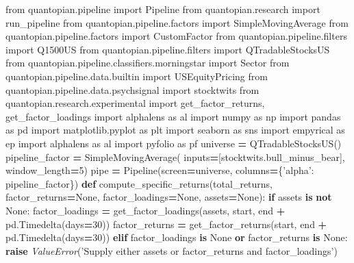 \documentclass[11,]{article}
\newenvironment{Shaded}{\begin{snugshade}}{\end{snugshade}}
\newcommand{\ControlFlowTok}[1]{\textcolor[rgb]{0.13,0.29,0.53}{\textbf{#1}}}
\newcommand{\DecValTok}[1]{\textcolor[rgb]{0.00,0.00,0.81}{#1}}
\newcommand{\ImportTok}[1]{#1}
\newcommand{\KeywordTok}[1]{\textcolor[rgb]{0.13,0.29,0.53}{\textbf{#1}}}
\newcommand{\NormalTok}[1]{#1}
\newcommand{\OperatorTok}[1]{\textcolor[rgb]{0.81,0.36,0.00}{\textbf{#1}}}
\newcommand{\PreprocessorTok}[1]{\textcolor[rgb]{0.56,0.35,0.01}{\textit{#1}}}
\newcommand{\StringTok}[1]{\textcolor[rgb]{0.31,0.60,0.02}{#1}}
\newcommand{\VariableTok}[1]{\textcolor[rgb]{0.00,0.00,0.00}{#1}}
\begin{document}
\begin{Shaded}
\begin{Highlighting}[]
\ImportTok{from}\NormalTok{ quantopian.pipeline }\ImportTok{import}\NormalTok{ Pipeline}
\ImportTok{from}\NormalTok{ quantopian.research }\ImportTok{import}\NormalTok{ run_pipeline}
\ImportTok{from}\NormalTok{ quantopian.pipeline.factors }\ImportTok{import}\NormalTok{ SimpleMovingAverage}
\ImportTok{from}\NormalTok{ quantopian.pipeline.factors }\ImportTok{import}\NormalTok{ CustomFactor}
\ImportTok{from}\NormalTok{ quantopian.pipeline.filters }\ImportTok{import}\NormalTok{ Q1500US}
\ImportTok{from}\NormalTok{ quantopian.pipeline.filters }\ImportTok{import}\NormalTok{ QTradableStocksUS}
\ImportTok{from}\NormalTok{ quantopian.pipeline.classifiers.morningstar }\ImportTok{import}\NormalTok{ Sector}
\ImportTok{from}\NormalTok{ quantopian.pipeline.data.builtin }\ImportTok{import}\NormalTok{ USEquityPricing}
\ImportTok{from}\NormalTok{ quantopian.pipeline.data.psychsignal }\ImportTok{import}\NormalTok{ stocktwits}
\ImportTok{from}\NormalTok{ quantopian.research.experimental }\ImportTok{import}\NormalTok{ get_factor_returns, get_factor_loadings}
\ImportTok{import}\NormalTok{ alphalens }\ImportTok{as}\NormalTok{ al}
\ImportTok{import}\NormalTok{ numpy }\ImportTok{as}\NormalTok{ np}
\ImportTok{import}\NormalTok{ pandas }\ImportTok{as}\NormalTok{ pd}
\ImportTok{import}\NormalTok{ matplotlib.pyplot }\ImportTok{as}\NormalTok{ plt}
\ImportTok{import}\NormalTok{ seaborn }\ImportTok{as}\NormalTok{ sns}
\ImportTok{import}\NormalTok{ empyrical }\ImportTok{as}\NormalTok{ ep}
\ImportTok{import}\NormalTok{ alphalens }\ImportTok{as}\NormalTok{ al}
\ImportTok{import}\NormalTok{ pyfolio }\ImportTok{as}\NormalTok{ pf}
\NormalTok{universe }\OperatorTok{=}\NormalTok{ QTradableStocksUS()}
\NormalTok{pipeline_factor }\OperatorTok{=}\NormalTok{ SimpleMovingAverage(}
\NormalTok{    inputs}\OperatorTok{=}\NormalTok{[stocktwits.bull_minus_bear], }
\NormalTok{    window_length}\OperatorTok{=}\DecValTok{5}\NormalTok{)}
\NormalTok{pipe }\OperatorTok{=}\NormalTok{ Pipeline(screen}\OperatorTok{=}\NormalTok{universe, columns}\OperatorTok{=}\NormalTok{\{}\StringTok{'alpha'}\NormalTok{: pipeline_factor\})}
\KeywordTok{def}\NormalTok{ compute_specific_returns(total_returns, factor_returns}\OperatorTok{=}\VariableTok{None}\NormalTok{, factor_loadings}\OperatorTok{=}\VariableTok{None}\NormalTok{, assets}\OperatorTok{=}\VariableTok{None}\NormalTok{):}
    \ControlFlowTok{if}\NormalTok{ assets }\KeywordTok{is} \KeywordTok{not} \VariableTok{None}\NormalTok{:}
\NormalTok{        factor_loadings }\OperatorTok{=}\NormalTok{ get_factor_loadings(assets, start, end }\OperatorTok{+}\NormalTok{ pd.Timedelta(days}\OperatorTok{=}\DecValTok{30}\NormalTok{))}
\NormalTok{        factor_returns }\OperatorTok{=}\NormalTok{ get_factor_returns(start, end }\OperatorTok{+}\NormalTok{ pd.Timedelta(days}\OperatorTok{=}\DecValTok{30}\NormalTok{))}
    \ControlFlowTok{elif}\NormalTok{ factor_loadings }\KeywordTok{is} \VariableTok{None} \KeywordTok{or}\NormalTok{ factor_returns }\KeywordTok{is} \VariableTok{None}\NormalTok{:}
        \ControlFlowTok{raise} \PreprocessorTok{ValueError}\NormalTok{(}\StringTok{'Supply either assets or factor_returns and factor_loadings'}\NormalTok{)}
    

\end{Highlighting}
\end{Shaded}
\end{document}
